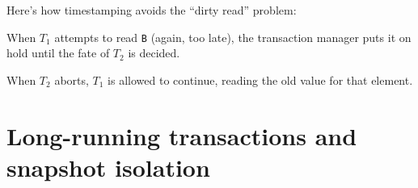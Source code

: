 %
%

\newsavebox\TimestampsDirtyReadTimeline
{}

\begin{frame}

Here's how timestamping avoids the ``dirty read'' problem:

\begin{center}
\scalebox{0.9}{\usebox{\TimestampsDirtyReadTimeline}}
\end{center}

When $T_1$ attempts to read \lstinline!B! (again, too late), the transaction manager puts it on hold until the fate of $T_2$ is decided.

When $T_2$ aborts, $T_1$ is allowed to continue, reading the old value for that element.
\end{frame}

\section{Long-running transactions and snapshot isolation}


